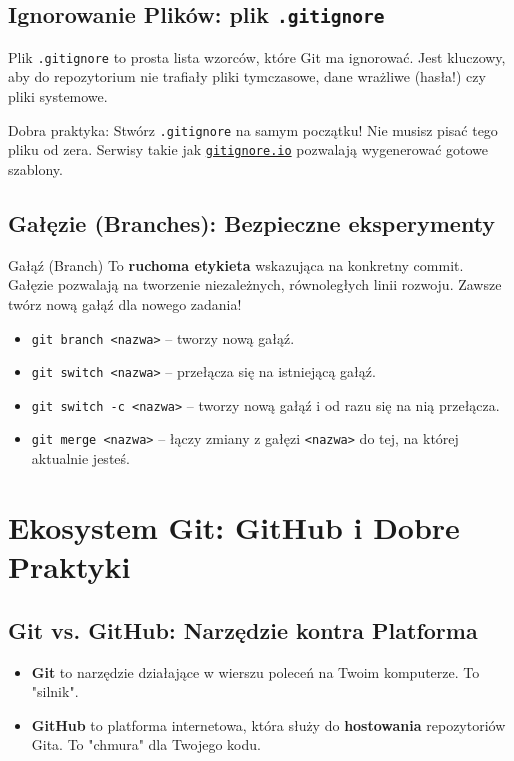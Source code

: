 \subsection{Ignorowanie Plików: plik \texttt{.gitignore}}
Plik \texttt{.gitignore} to prosta lista wzorców, które Git ma ignorować. Jest kluczowy, aby do repozytorium nie trafiały pliki tymczasowe, dane wrażliwe (hasła!) czy pliki systemowe.
\begin{importantbox}{Dobra praktyka: Stwórz \texttt{.gitignore} na samym początku!}
Nie musisz pisać tego pliku od zera. Serwisy takie jak \href{https://www.toptal.com/developers/gitignore}{\texttt{gitignore.io}} pozwalają wygenerować gotowe szablony.
\end{importantbox}

\subsection{Gałęzie (Branches): Bezpieczne eksperymenty}
\begin{definitionbox}{Gałąź (Branch)}
To \textbf{ruchoma etykieta} wskazująca na konkretny commit. Gałęzie pozwalają na tworzenie niezależnych, równoległych linii rozwoju. Zawsze twórz nową gałąź dla nowego zadania!
\end{definitionbox}
\begin{itemize}
    \item \texttt{git branch <nazwa>} -- tworzy nową gałąź.
    \item \texttt{git switch <nazwa>} -- przełącza się na istniejącą gałąź.
    \item \texttt{git switch -c <nazwa>} -- tworzy nową gałąź i od razu się na nią przełącza.
    \item \texttt{git merge <nazwa>} -- łączy zmiany z gałęzi \texttt{<nazwa>} do tej, na której aktualnie jesteś.
\end{itemize}

\section{Ekosystem Git: GitHub i Dobre Praktyki}
\subsection{Git vs. GitHub: Narzędzie kontra Platforma}
\begin{itemize}
    \item \textbf{Git} to narzędzie działające w wierszu poleceń na Twoim komputerze. To "silnik".
    \item \textbf{GitHub} to platforma internetowa, która służy do \textbf{hostowania} repozytoriów Gita. To "chmura" dla Twojego kodu.
\end{itemize}

